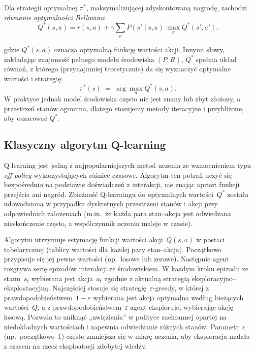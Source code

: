 \documentclass[a4paper,12pt]{article}
\begin{document}
Dla strategii optymalnej \(\pi^*\), maksymalizującej zdyskontowaną nagrodę, zachodzi \emph{równanie optymalności Bellmana}:
\begin{equation}
Q^*(s,a)
= r(s,a) + \gamma \sum_{s'} P(s'\mid s,a)\,\max_{a'} Q^*(s',a').
\end{equation}

gdzie \(Q^*(s,a)\) oznacza optymalną funkcję wartości akcji. Innymi słowy, zakładając znajomość pełnego modelu środowiska \((P,R)\), \(Q^*\) spełnia układ równań, z którego (przynajmniej teoretycznie) da się wyznaczyć optymalne wartości i strategię:
\begin{equation}
\pi^*(s) \;=\; \arg\max_{a} Q^*(s,a).
\end{equation}
W praktyce jednak model środowiska często nie jest znany lub zbyt złożony, a przestrzeń stanów ogromna, dlatego stosujemy metody iteracyjne i przybliżone, aby oszacować \(Q^*\).

\subsection{Klasyczny algorytm Q-learning}

Q-learning jest jedną z najpopularniejszych metod uczenia ze wzmocnieniem typu \emph{off-policy} wykorzystujących różnice czasowe. Algorytm ten potrafi uczyć się bezpośrednio na podstawie doświadczeń z interakcji, nie znając apriori funkcji przejścia ani nagród. Zbieżność Q-learningu do optymalnych wartości~$Q^*$ została udowodniona w przypadku dyskretnych przestrzeni stanów i akcji przy odpowiednich założeniach (m.in.\ że każda para stan–akcja jest odwiedzana nieskończenie często, a współczynnik uczenia maleje w czasie).

Algorytm utrzymuje estymację funkcji wartości akcji~$Q(s,a)$ w postaci tabelarycznej (tablicy wartości dla każdej pary stan–akcja). Początkowo przypisuje się jej pewne wartości (np.\ losowe lub zerowe). Następnie agent rozgrywa serię epizodów interakcji ze środowiskiem. W każdym kroku epizodu ze stanu~$s_t$ wybierana jest akcja~$a_t$ zgodnie z aktualną strategią eksploracyjno–eksploatacyjną. Najczęściej stosuje się strategię~$\varepsilon$-greedy, w której z prawdopodobieństwem~$1-\varepsilon$ wybierana jest akcja optymalna według bieżących wartości~$Q$, a z prawdopodobieństwem~$\varepsilon$ agent eksploruje, wybierając akcję losową. Pozwala to uniknąć „uwięzienia” w polityce zachłannej opartej na niedokładnych wartościach i zapewnia odwiedzanie różnych stanów. Parametr~$\varepsilon$ (np.\ początkowo~1) często zmniejsza się w miarę uczenia, aby eksploracja malała z czasem na rzecz eksploatacji zdobytej wiedzy.
\end{document}
